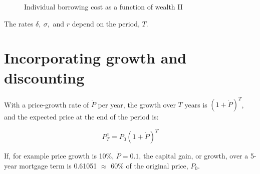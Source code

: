 \begin{figure}
\caption{Individual borrowing cost as a function of wealth II}
\label{Fig:Borrowingrate2}
\end{figure}

The rates $\delta,\ \sigma,$ and $r$ depend on the period, $T$. 

\section{Incorporating growth and discounting}

With a price-growth rate of $\dot P$ per year, the growth over $T$ years is $(1+\dot P)^T$, and  %
the expected price at the end of the period is:

\[P^e_T=P_0(1+\dot P)^T\]

If, for example price growth is 10\%, $\dot P= 0.1$, the {capital gain}, or growth, over a 5-year mortgage term is 0.61051 $\approx$ 60\% of the original price, $P_0$.

